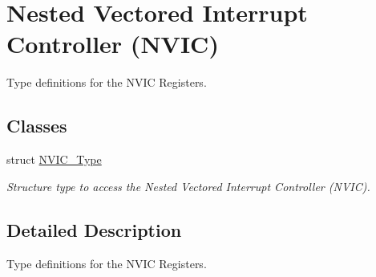 \hypertarget{group___c_m_s_i_s___n_v_i_c}{}\section{Nested Vectored Interrupt Controller (N\+V\+I\+C)}
\label{group___c_m_s_i_s___n_v_i_c}


Type definitions for the N\+V\+I\+C Registers.  


\subsection*{Classes}
\begin{DoxyCompactItemize}
\item 
struct \hyperlink{struct_n_v_i_c___type}{N\+V\+I\+C\+\_\+\+Type}
\begin{DoxyCompactList}\small\item\em Structure type to access the Nested Vectored Interrupt Controller (N\+V\+I\+C). \end{DoxyCompactList}\end{DoxyCompactItemize}


\subsection{Detailed Description}
Type definitions for the N\+V\+I\+C Registers. 

